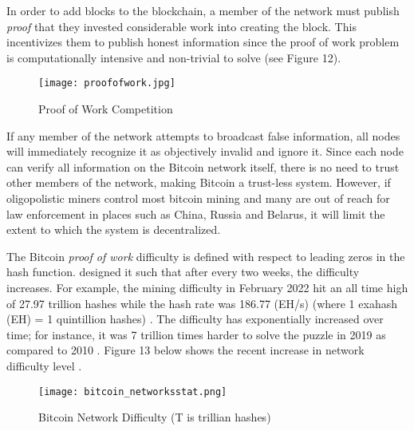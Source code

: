 \documentclass[12pt]{article}
\newcommand{\1}{\mathbbm 1}
\begin{document}
		
		
		
		In order to add blocks to the blockchain, a member of the network must publish \textit{proof} that they invested considerable work into creating the block. This incentivizes them to publish honest information since the proof of work problem is computationally intensive and non-trivial to solve (see Figure 12).
		
		
		\begin{figure}[H]
			\begin{Center}
				\texttt{[image: proofofwork.jpg]}		
				\caption{Proof of Work Competition}
			\end{Center}
		\end{figure}
		
		
		
		If any member of the network attempts to broadcast false information, all nodes will immediately recognize it as objectively invalid and ignore it. Since each node can verify all information on the Bitcoin network itself, there is no need to trust other members of the network, making Bitcoin a trust-less system. However, if oligopolistic miners control most bitcoin mining \cite{roubini2018blockchain} and many are out of reach for law enforcement in places such as China, Russia and Belarus, it will limit the extent to which the system is decentralized.
		
		
		
		The Bitcoin \textit{proof of work} difficulty is defined with respect to leading zeros in the hash function. \cite{nakamoto2008bitcoin} designed it such that after every two weeks, the difficulty increases. For example, the mining difficulty in February 2022 hit an all time high of 27.97 trillion hashes while the hash rate was 186.77 (EH/s) (where 1 exahash (EH) = 1 quintillion hashes) \cite{vaca2022}. The difficulty has exponentially increased over time; for instance, it was 7 trillion times harder to solve the puzzle in 2019 as compared to 2010 \cite{hacioglu2020digital}. Figure 13 below shows the recent increase in network difficulty level \cite{vaca2022}.
		
		
		
		
		
		
		
		
		
		
		
		
		\begin{figure}[H]
			\begin{Center}
				\texttt{[image: bitcoin\_networksstat.png]}		
				\caption{Bitcoin Network Difficulty (T is trillian hashes)}
			\end{Center}
		\end{figure}
		
\end{document}
